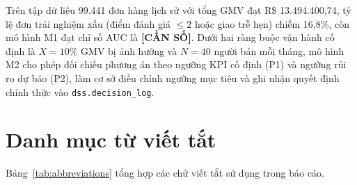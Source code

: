 \documentclass[a4paper]{article}
\begin{document}
Trên tập dữ liệu 99.441 đơn hàng lịch sử với tổng GMV đạt R\$ 13.494.400,74, tỷ lệ đơn trải nghiệm xấu (điểm đánh giá $\le 2$ hoặc giao trễ hẹn) chiếm 16,8\%, còn mô hình M1 đạt chỉ số AUC là \textbf{[CẦN SỐ]}. Dưới hai ràng buộc vận hành cố định là $X = 10\%$ GMV bị ảnh hưởng và $N = 40$ người bán mỗi tháng, mô hình M2 cho phép đối chiếu phương án theo ngưỡng KPI cố định (P1) và ngưỡng rủi ro dự báo (P2), làm cơ sở điều chỉnh ngưỡng mục tiêu và ghi nhận quyết định chính thức vào \texttt{dss.decision\_log}.

{}
\section*{Danh mục từ viết tắt}
\nopagebreak[4]
Bảng~\ref{tab:abbreviations} tổng hợp các chữ viết tắt sử dụng trong báo cáo.\par
\nopagebreak[4]
\end{document}
